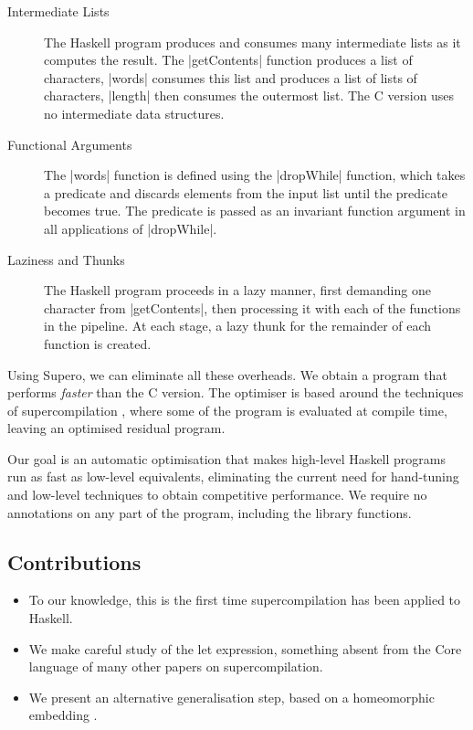\begin{description}
\item[Intermediate Lists] The Haskell program produces and consumes many intermediate lists as it computes the result. The |getContents| function produces a list of characters, |words| consumes this list and produces a list of lists of characters, |length| then consumes the outermost list. The C version uses no intermediate data structures.
\item[Functional Arguments] The |words| function is defined using the |dropWhile| function, which takes a predicate and discards elements from the input list until the predicate becomes true. The predicate is passed as an invariant function argument in all applications of |dropWhile|.
\item[Laziness and Thunks] The Haskell program proceeds in a lazy manner, first demanding one character from |getContents|, then processing it with each of the functions in the pipeline. At each stage, a lazy thunk for the remainder of each function is created.
\end{description}

Using Supero, we can eliminate all these overheads. We obtain a program that performs \textit{faster} than the C version. The optimiser is based around the techniques of supercompilation \cite{supercompilation}, where some of the program is evaluated at compile time, leaving an optimised residual program.

Our goal is an automatic optimisation that makes high-level Haskell programs run as fast as low-level equivalents, eliminating the current need for hand-tuning and low-level techniques to obtain competitive performance. We require no annotations on any part of the program, including the library functions.

\subsection{Contributions}

\begin{itemize}
\item To our knowledge, this is the first time supercompilation has been applied to Haskell.
\item We make careful study of the let expression, something absent from the Core language of many other papers on supercompilation.
\item We present an alternative generalisation step, based on a homeomorphic embedding \cite{leuschel:homeomorphic}.
\end{itemize}


